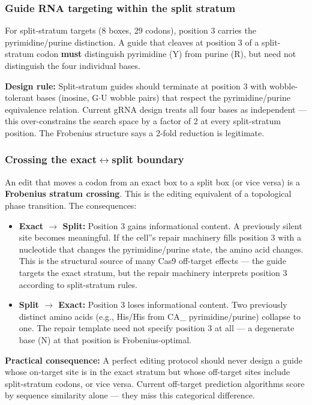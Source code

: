 \documentclass[12pt,a4paper]{article}
\begin{document}
\subsubsection{Guide RNA targeting within the split stratum}

For split-stratum targets (8 boxes, 29 codons), position 3 carries the pyrimidine/purine distinction. A guide that cleaves at position 3 of a split-stratum codon \textbf{must} distinguish pyrimidine (Y) from purine (R), but need not distinguish the four individual bases.

\textbf{Design rule:} Split-stratum guides should terminate at position 3 with wobble-tolerant bases (inosine, G$\cdot$U wobble pairs) that respect the pyrimidine/purine equivalence relation. Current gRNA design treats all four bases as independent --- this over-constrains the search space by a factor of 2 at every split-stratum position. The Frobenius structure says a 2-fold reduction is legitimate.

\subsubsection{Crossing the exact$\leftrightarrow$split boundary}

An edit that moves a codon from an exact box to a split box (or vice versa) is a \textbf{Frobenius stratum crossing}. This is the editing equivalent of a topological phase transition. The consequences:

\begin{itemize}
    \item \textbf{Exact $\rightarrow$ Split:} Position 3 gains informational content. A previously silent site becomes meaningful. If the cell''s repair machinery fills position 3 with a nucleotide that changes the pyrimidine/purine state, the amino acid changes. This is the structural source of many Cas9 off-target effects --- the guide targets the exact stratum, but the repair machinery interprets position 3 according to split-stratum rules.
    \item \textbf{Split $\rightarrow$ Exact:} Position 3 loses informational content. Two previously distinct amino acids (e.g., His/His from CA\_ pyrimidine/purine) collapse to one. The repair template need not specify position 3 at all --- a degenerate base (N) at that position is Frobenius-optimal.
\end{itemize}

\textbf{Practical consequence:} A perfect editing protocol should never design a guide whose on-target site is in the exact stratum but whose off-target sites include split-stratum codons, or vice versa. Current off-target prediction algorithms score by sequence similarity alone --- they miss this categorical difference.
\end{document}
